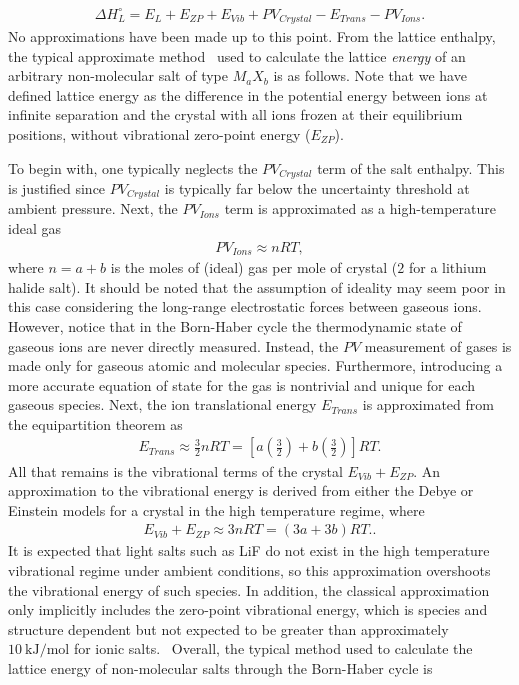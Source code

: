 \documentclass[preprint,aps,prb,floatfix]{revtex4-1}
\begin{document}
\begin{align}
\Delta H^{\circ}_{L} = E_{L} + E_{ZP} + E_{Vib} + PV_{Crystal} - E_{Trans} - PV_{Ions}.
\end{align}
No approximations have been made up to this point. From the lattice enthalpy, the typical approximate method~\cite{book:CRC,Jenkins2005} used to calculate the lattice \textit{energy} of an arbitrary non-molecular salt of type $M_{a}X_{b}$ is as follows. Note that we have defined lattice energy as the difference in the potential energy between ions at infinite separation and the crystal with all ions frozen at their equilibrium positions, without vibrational zero-point energy ($E_{ZP}$).

To begin with, one typically neglects the $PV_{Crystal}$ term of the salt enthalpy. This is justified since $PV_{Crystal}$ is typically far below the uncertainty threshold at ambient pressure. Next, the $PV_{Ions}$ term is approximated as a high-temperature ideal gas
\begin{align}
PV_{Ions} \approx  n R T,
\label{eq:PV_Ions}
\end{align}
where $n = a + b$ is the moles of (ideal) gas per mole of crystal ($2$ for a lithium halide salt). It should be noted that the assumption of ideality may seem poor in this case considering the long-range electrostatic forces between gaseous ions. However, notice that in the Born-Haber cycle the thermodynamic state of gaseous ions are never directly measured. Instead, the $PV$ measurement of gases is made only for gaseous atomic and molecular species. Furthermore, introducing a more accurate equation of state for the gas is nontrivial and unique for each gaseous species. Next, the ion translational energy $E_{Trans}$ is approximated from the equipartition theorem as~\cite{Jenkins2005}
\begin{align}
E_{Trans} \approx  \frac{3}{2} n R T = \left[ a \left( \frac { 3 }{ 2 } \right) + b \left( \frac{ 3 } { 2 } \right) \right] R T.
\label{eq:E_Trans}
\end{align}
All that remains is the vibrational terms of the crystal $E_{Vib} + E_{ZP}$. An approximation to the vibrational energy is derived from either the Debye or Einstein models for a crystal in the high temperature regime, where 
\begin{align}
E_{Vib} + E_{ZP} \approx  3 n R T = \left( 3 a  + 3 b \right) R T.
\label{eq:E_Vib}.
\end{align} 
It is expected that light salts such as LiF do not exist in the high temperature vibrational regime under ambient conditions, so this approximation overshoots the vibrational energy of such species. In addition, the classical approximation only implicitly includes the zero-point vibrational energy, which is species and structure dependent but not expected to be greater than approximately $\SI{10}{\kilo\joule\per\mole}$ for ionic salts.~\cite{froyen1984} Overall, the typical method used to calculate the lattice energy of non-molecular salts through the Born-Haber cycle is
\end{document}

